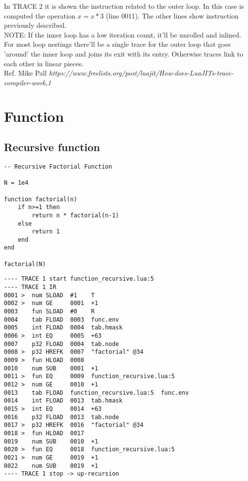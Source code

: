 In TRACE 2 it is shown the instruction related to the outer loop. In this case is computed the operation $x=x*3$ (line 0011). The other lines show instruction previously described.\\

NOTE: If the inner loop has a low iteration count, it'll be
unrolled and inlined. For most loop nestings there'll be a single trace for the outer loop that goes 'around' the inner loop and joins its exit with its entry. Otherwise traces link to each other
in linear pieces.\\
Ref. Mike Pall \textit{https://www.freelists.org/post/luajit/How-does-LuaJITs-trace-compiler-work,1}\\

\section{Function}

\subsection{Recursive function}

\begin{lstlisting}[style=LuaStyle]
-- Recursive Factorial Function

N = 1e4 

function factorial(n)
	if n>=1 then
		return n * factorial(n-1)
	else
		return 1
	end
end

factorial(N)
\end{lstlisting}

\begin{lstlisting}[style=DumpStyle]
---- TRACE 1 start function_recursive.lua:5
---- TRACE 1 IR
0001 >  num SLOAD  #1    T
0002 >  num GE     0001  +1  
0003    fun SLOAD  #0    R
0004    tab FLOAD  0003  func.env
0005    int FLOAD  0004  tab.hmask
0006 >  int EQ     0005  +63 
0007    p32 FLOAD  0004  tab.node
0008 >  p32 HREFK  0007  "factorial" @34
0009 >  fun HLOAD  0008
0010    num SUB    0001  +1  
0011 >  fun EQ     0009  function_recursive.lua:5
0012 >  num GE     0010  +1  
0013    tab FLOAD  function_recursive.lua:5  func.env
0014    int FLOAD  0013  tab.hmask
0015 >  int EQ     0014  +63 
0016    p32 FLOAD  0013  tab.node
0017 >  p32 HREFK  0016  "factorial" @34
0018 >  fun HLOAD  0017
0019    num SUB    0010  +1  
0020 >  fun EQ     0018  function_recursive.lua:5
0021 >  num GE     0019  +1  
0022    num SUB    0019  +1  
---- TRACE 1 stop -> up-recursion
\end{lstlisting}


